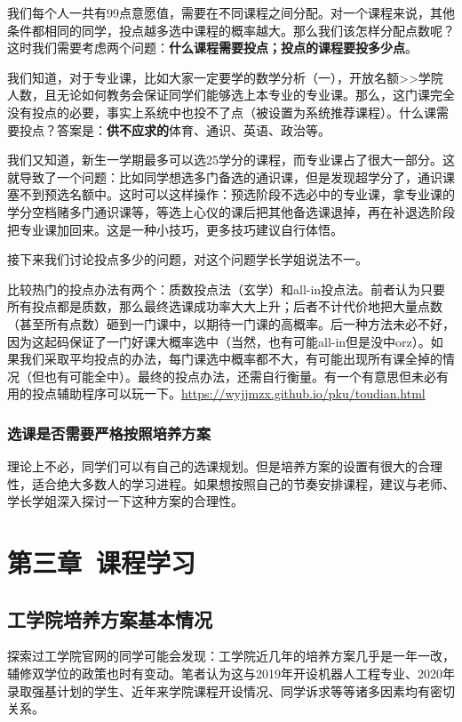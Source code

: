 \documentclass[11pt,oneside]{book}
\begin{document}
我们每个人一共有99点意愿值，需要在不同课程之间分配。对一个课程来说，其他条件都相同的同学，投点越多选中课程的概率越大。那么我们该怎样分配点数呢？这时我们需要考虑两个问题：\textbf{\textbf{什么课程需要投点；投点的课程要投多少点}}。

我们知道，对于专业课，比如大家一定要学的数学分析（一），开放名额>>学院人数，且无论如何教务会保证同学们能够选上本专业的专业课。那么，这门课完全没有投点的必要，事实上系统中也投不了点（被设置为系统推荐课程）。什么课需要投点？答案是：\textbf{\textbf{供不应求的}}体育、通识、英语、政治等。

我们又知道，新生一学期最多可以选25学分的课程，而专业课占了很大一部分。这就导致了一个问题：比如同学想选多门备选的通识课，但是发现超学分了，通识课塞不到预选名额中。这时可以这样操作：预选阶段不选必中的专业课，拿专业课的学分空档赌多门通识课等，等选上心仪的课后把其他备选课退掉，再在补退选阶段把专业课加回来。这是一种小技巧，更多技巧建议自行体悟。

接下来我们讨论投点多少的问题，对这个问题学长学姐说法不一。

比较热门的投点办法有两个：质数投点法（玄学）和all-in投点法。前者认为只要所有投点都是质数，那么最终选课成功率大大上升；后者不计代价地把大量点数（甚至所有点数）砸到一门课中，以期待一门课的高概率。后一种方法未必不好，因为这起码保证了一门好课大概率选中（当然，也有可能all-in但是没中orz）。如果我们采取平均投点的办法，每门课选中概率都不大，有可能出现所有课全掉的情况（但也有可能全中）。最终的投点办法，还需自行衡量。有一个有意思但未必有用的投点辅助程序可以玩一下。\href{https://wyjjmzx.github.io/pku/toudian.html}{https://wyjjmzx.github.io/pku/toudian.html}

\subsection{选课是否需要严格按照培养方案}
理论上不必，同学们可以有自己的选课规划。但是培养方案的设置有很大的合理性，适合绝大多数人的学习进程。如果想按照自己的节奏安排课程，建议与老师、学长学姐深入探讨一下这种方案的合理性。


\chapter{第三章\ 课程学习}
\section{工学院培养方案基本情况}
探索过工学院官网的同学可能会发现：工学院近几年的培养方案几乎是一年一改，辅修双学位的政策也时有变动。笔者认为这与2019年开设机器人工程专业、2020年录取强基计划的学生、近年来学院课程开设情况、同学诉求等等诸多因素均有密切关系。
\end{document}

